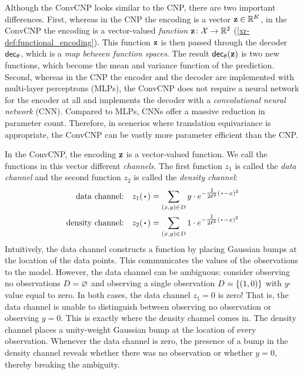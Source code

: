 \documentclass[12pt]{report}
\newcommand{\xrprefix}[1]{xr-#1}
\begin{document}
Although the ConvCNP looks similar to the CNP, there are two important differences.
First, whereas in the CNP the encoding is a vector $\mathbf{z} \in \mathbb{R}^{K}$, in the ConvCNP the encoding is a vector-valued \emph{function} $\mathbf{z}\colon \mathcal{X} \to \mathbb{R}^2$ (\cref{\xrprefix{def:functional_encoding}}).
This function $\mathbf{z}$ is then passed through the decoder $\mathsf{dec}_\theta$, which is a \emph{map between function spaces}.
The result $\mathsf{dec}_\theta(\mathbf{z})$ is two new functions, which become the mean and variance function of the prediction.
Second, whereas in the CNP the encoder and the decoder are implemented with multi-layer perceptrons (MLPs), the ConvCNP does not require a neural network for the encoder at all and implements the decoder with a \emph{convolutional neural network} (CNN).
Compared to MLPs, CNNs offer a massive reduction in parameter count.
Therefore, in scenerios where translation equivariance is appropriate, the ConvCNP can be vastly more parameter efficient than the CNP.

In the ConvCNP, the encoding $\mathbf{z}$ is a vector-valued function.
We call the functions in this vector different \emph{channels}.
The first function $z_1$ is called the \emph{data channel} and the second function $z_2$ is called the \emph{density channel}:
\begin{align}
    \text{data channel:} &
    \quad z_1(\vardot) =
    \sum_{(x, y) \in D}
    y \cdot e^{-\tfrac1{2\ell^2}(\vardot - x)^2} \label{eq:data_channel} \\
    \text{density channel:} &
    \quad z_2(\vardot) =
    \sum_{(x, y) \in D}
    1 \cdot e^{-\tfrac1{2\ell^2}(\vardot - x)^2} \label{eq:density_channel}
\end{align}
Intuitively, the data channel constructs a function by placing Gaussian bumps at the location of the data points.
This communicates the values of the observations to the model.
However, the data channel can be ambiguous:
consider observing no observations $D = \varnothing$ and observing a single observation $D = \{(1, 0)\}$ with $y$-value equal to zero.
In both cases, the data channel $z_1 = 0$ is zero!
That is, the data channel is unable to distinguish between observing no observation or observing $y=0$.
This is exactly where the density channel comes in.
The density channel places a unity-weight Gaussian bump at the location of every observation.
Whenever the data channel is zero, the presence of a bump in the density channel reveals whether there was no observation or whether $y=0$, thereby breaking the ambiguity.
\end{document}
